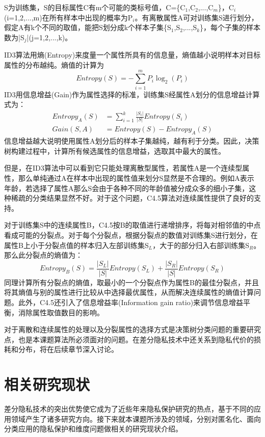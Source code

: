 \begin{exmp}
	\label{exmp_ID3}
	S为训练集，S的目标属性C有m个可能的类标号值，C=\{C$_{1}$,C$_{2}$,...,C$_{m}$\}，C$_{i}$(i=1,2,...,m)在所有样本中出现的概率为P$_{i}$。有离散属性A可对训练集S进行划分，假定A有k个不同的取值，能把S划分成k个样本子集\{S$_{1}$,S$_{2}$,...,S$_{k}$\}，每个子集的样本数为|S$_{j}$|(j=1,2,...,k)。
\end{exmp}
ID3算法用熵(Entropy)来度量一个属性所具有的信息量，熵值越小说明样本对目标属性的分布越纯。熵值的计算为
\[
	Entropy(S) = -\sum_{i=1}^{m}P_{i}\log_{2}(P_{i})
\]
ID3用信息增益(Gain)作为属性选择的标准，训练集S经属性A划分的信息增益计算式为：
\[
\begin{split}
	Entropy_{A}(S) &= \sum_{i=1}^{k}\frac{|S_{i}|}{|S|}Entropy(S_{i})\\
	Gain(S,A) &= Entropy(S)-Entropy_{A}(S)
\end{split}
\]
信息增益越大说明使用属性A划分后的样本子集越纯，越有利于分类。因此，决策树构建过程中，计算所有候选属性的信息增益，选取其中最大的属性。

但是，在ID3算法中可以看到它只能处理离散型属性，若属性A是一个连续型属性，那么单纯通过A在样本中出现的属性值来划分S显然是不合理的。例如A表示年龄，若选择了属性A那么S会由于各种不同的年龄值被分成众多的细小子集，这种稀疏的分类结果显然不好。对于这个问题，C4.5算法对连续属性提供了良好的支持。

对于训练集S中的连续属性B，C4.5按B的取值进行递增排序，将每对相邻值的中点看成可能的分裂点。对于每个分裂点，根据分裂点的数值对训练集S进行划分，在属性B上小于分裂点值的样本归入左部训练集S$_{L}$，大于的部分归入右部训练集S$_{R}$。那么此分裂点的熵值为：
\[
	Entropy_{B}(S) = \frac{|S_{L}|}{|S|}Entropy(S_{L})+\frac{|S_{R}|}{|S|}Entropy(S_{R})
\]
同理计算所有分裂点的熵值，取最小的一个分裂点作为属性B的最佳分裂点，并且将其熵值与别的属性进行比较从中选择最优属性，从而解决连续属性的熵值计算问题。此外，C4.5还引入了信息增益率(Information gain ratio)来调节信息增益平衡，消除属性取值数目的影响。

对于离散和连续属性的处理以及分裂属性的选择方式是决策树分类问题的重要研究点，也是本课题算法所必须面对的问题。在差分隐私技术中还关系到隐私代价的损耗和分布，将在后续章节深入讨论。

\section{相关研究现状} %

差分隐私技术的突出优势使它成为了近些年来隐私保护研究的热点，基于不同的应用领域产生了诸多研究方向。接下来就本课题所涉及的领域，分别对匿名化、面向分类应用的隐私保护和维度问题做相关的研究现状介绍。

